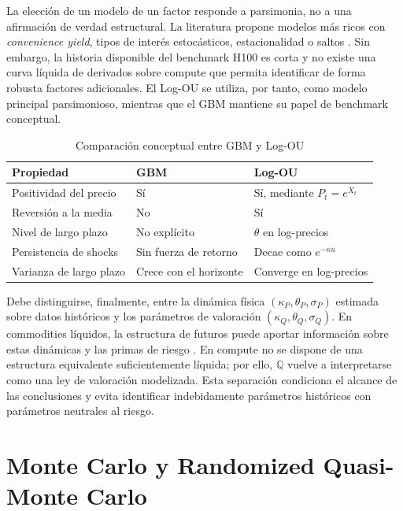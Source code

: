 La elección de un modelo de un factor responde a parsimonia, no a una afirmación
de verdad estructural. La literatura propone modelos más ricos con
\textit{convenience yield}, tipos de interés estocásticos, estacionalidad o saltos
\cite{gibson_schwartz_1990,schwartz_1997,lucia_schwartz_2002,
cartea_figueroa_2005}. Sin embargo, la historia disponible del benchmark H100 es
corta y no existe una curva líquida de derivados sobre compute que permita
identificar de forma robusta factores adicionales. El Log-OU se utiliza, por
tanto, como modelo principal parsimonioso, mientras que el GBM mantiene su papel
de benchmark conceptual.

\begin{table}[htbp]
\centering
\small
\caption{Comparación conceptual entre GBM y Log-OU}
\label{tab:gbm_logou_comparison}
\begin{tabular}{p{3.8cm}p{4.2cm}p{4.2cm}}
\toprule
\textbf{Propiedad} & \textbf{GBM} & \textbf{Log-OU} \\
\midrule
Positividad del precio & Sí & Sí, mediante $P_t=e^{X_t}$ \\
Reversión a la media & No & Sí \\
Nivel de largo plazo & No explícito & $\theta$ en log-precios \\
Persistencia de shocks & Sin fuerza de retorno & Decae como $e^{-\kappa u}$ \\
Varianza de largo plazo & Crece con el horizonte & Converge en log-precios \\
\bottomrule
\end{tabular}
\end{table}

Debe distinguirse, finalmente, entre la dinámica física
$(\kappa_P,\theta_P,\sigma_P)$ estimada sobre datos históricos y los parámetros de
valoración $(\kappa_Q,\theta_Q,\sigma_Q)$. En commodities líquidos, la estructura
de futuros puede aportar información sobre estas dinámicas y las primas de riesgo
\cite{gibson_schwartz_1990,schwartz_1997}. En compute no se dispone de una
estructura equivalente suficientemente líquida; por ello, $\mathbb Q$ vuelve a
interpretarse como una ley de valoración modelizada. Esta separación condiciona el
alcance de las conclusiones y evita identificar indebidamente parámetros históricos
con parámetros neutrales al riesgo.

\section{Monte Carlo y Randomized Quasi-Monte Carlo}
\label{sec:mc_rqmc_literature}

